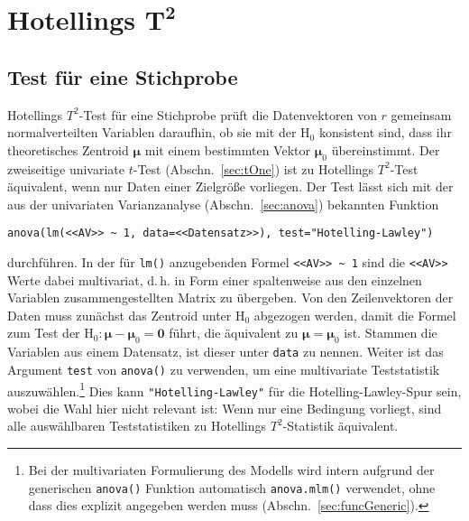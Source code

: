 \section[Hotellings \texorpdfstring{$T^{2}$}{T2}]{Hotellings \texorpdfstring{$\bm{T^{2}}$}{T2}}
\label{sec:multHotelling}

\subsection{Test für eine Stichprobe}
\label{sec:multHotellingOne}

Hotellings $T^{2}$-Test für eine Stichprobe prüft die Datenvektoren von $r$ gemeinsam normalverteilten Variablen daraufhin, ob sie mit der $\text{H}_{0}$ konsistent sind, dass ihr theoretisches Zentroid $\bm{\mu}$ mit einem bestimmten Vektor $\bm{\mu}_{0}$ übereinstimmt. Der zweiseitige univariate $t$-Test (Abschn.\ \ref{sec:tOne}) ist zu Hotellings $T^{2}$-Test äquivalent, wenn nur Daten einer Zielgröße vorliegen. Der Test lässt sich mit der aus der univariaten Varianzanalyse (Abschn.\ \ref{sec:anova}) bekannten Funktion
\begin{lstlisting}
anova(lm(<<AV>> ~ 1, data=<<Datensatz>>), test="Hotelling-Lawley")
\end{lstlisting}

durchführen. In der für \lstinline!lm()! anzugebenden Formel \lstinline!<<AV>> ~ 1! sind die \lstinline!<<AV>>! Werte dabei multivariat, d.\,h. in Form einer spaltenweise aus den einzelnen Variablen zusammengestellten Matrix zu übergeben. Von den Zeilenvektoren der Daten muss zunächst das Zentroid unter $\text{H}_{0}$ abgezogen werden, damit die Formel zum Test der $\text{H}_{0}: \bm{\mu} - \bm{\mu}_{0} = \bm{0}$ führt, die äquivalent zu $\bm{\mu} = \bm{\mu}_{0}$ ist. Stammen die Variablen aus einem Datensatz, ist dieser unter \lstinline!data! zu nennen. Weiter ist das Argument \lstinline!test! von \lstinline!anova()! zu verwenden, um eine multivariate Teststatistik auszuwählen.\footnote{Bei der multivariaten Formulierung des Modells wird intern aufgrund der generischen \lstinline!anova()! Funktion automatisch \lstinline!anova.mlm()! verwendet, ohne dass dies explizit angegeben werden muss (Abschn.\ \ref{sec:funcGeneric}).} Dies kann \lstinline!"Hotelling-Lawley"! für die Hotelling-Lawley-Spur sein, wobei die Wahl hier nicht relevant ist: Wenn nur eine Bedingung vorliegt, sind alle auswählbaren Teststatistiken zu Hotellings $T^{2}$-Statistik äquivalent.

